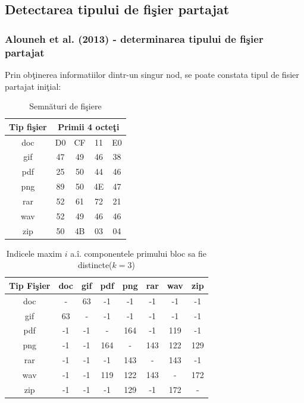 \documentclass{beamer}
\theoremstyle{definition}
\begin{document}
\subsection{Detectarea tipului de fi\c{s}ier partajat}
\begin{frame}
    \frametitle{Alouneh et al. (2013) - determinarea tipului de fi\c{s}ier partajat}
    Prin ob\c{t}inerea informatiilor dintr-un singur nod, se poate constata tipul de fisier partajat ini\c{t}ial:
     {
        \begin{table}[b]
        \bigskip
        \begin{center}
        \caption{Semn\u{a}turi de fi\c{s}iere}\label{tb:margins}
        \label{table:sign}
            \begin{tabular}{ccccc}
            Tip fi\c{s}ier &  \multicolumn{4}{c}{Primii 4 octe\c{t}i}\\ \hline 
            doc &  D0 & CF & 11 & E0\\
            gif & 47 & 49 & 46 & 38 \\
            pdf & 25 & 50 & 44 & 46 \\
            png & 89 & 50 & 4E & 47 \\
            rar & 52 & 61 & 72 & 21 \\
            wav & 52 & 49 & 46 & 46 \\
            zip & 50 & 4B & 03 & 04\\  \hline
            \end{tabular}
        \end{center}
        \bigskip
        \end{table}
    }
     {
    \begin{table}[t]
        \begin{center}
        \caption{Indicele maxim $i$ a.\^{i}. componentele primului bloc sa fie distincte($k=3$)}\label{tb:margins}
        \label{table:k3}
        \begin{tabular}{cccccccc}
        Tip Fi\c{s}ier & doc & gif & pdf & png & rar & wav & zip \\\hline
          doc & - & 63 & -1 & -1 & -1 & -1 & -1\\
          gif & 63 & - & -1 & -1 & -1 & -1 & -1\\
          pdf & -1 & -1 & - & 164 & -1 & 119 & -1\\
          png & -1 & -1 & 164 & - & 143 & 122 & 129\\
          rar & -1 & -1 & -1 & 143 & - & 143 & -1\\
          wav & -1 & -1 & 119 & 122 & 143 & - & 172\\
          zip & -1 & -1 & -1 & 129 & -1 & 172 & -\\ \hline
        \end{tabular}
        \end{center}
        \bigskip
    \end{table}
    }
\end{frame}
\end{document}
